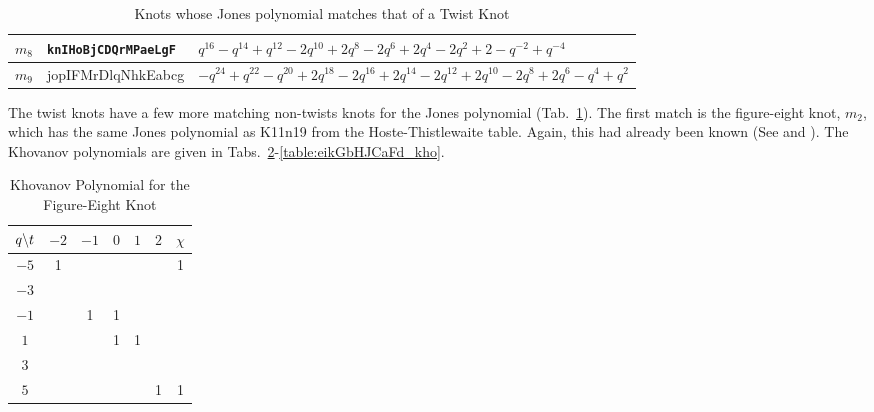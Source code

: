 \documentclass{article}
\theoremstyle{plain}
\begin{document}
\begin{table}[H]
{\begin{tabular}{| l | l | l |}
                    \hline
                        $m_{8}$&
                        \texttt{knIHoBjCDQrMPaeLgF}&
                        $q^{16}-q^{14}+q^{12}-2q^{10}+2q^{8}-2q^{6}+2q^{4}-2q^{2}+2-q^{-2}+q^{-4}$\\
                    \hline
                        $m_{9}$&
                        jopIFMrDlqNhkEabcg&
                        $-q^{24}+q^{22}-q^{20}+2q^{18}-2q^{16}+2q^{14}-2q^{12}+2q^{10}-2q^{8}+2q^{6}-q^{4}+q^{2}$\\
                    \hline
                \end{tabular}%
            }
            \caption{Knots whose Jones polynomial matches that of a Twist Knot}
            \label{table:matching_twist_knots}
        \end{table}
        The twist knots have a few more matching non-twists knots for the
        Jones polynomial
        (Tab.~\ref{table:matching_twist_knots}). The first match is the
        figure-eight knot, $m_{2}$, which has the same Jones polynomial as
        K11n19 from the Hoste-Thistlewaite table.
        Again, this had already been known
        (See \cite{KatlasFigureEight} and \cite{KatlasK11n19}).
        The Khovanov polynomials are
        given in Tabs.~\ref{table:m_2_kho}-\ref{table:eikGbHJCaFd_kho}.
        \begin{table}[H]
            \centering
            \begin{tabular}{| c | c | c | c | c | c | c |}
                \hline
                $q\symbol{92}t$&$-2$&$-1$&$0$&$1$&$2$&$\chi$\\
                \hline
                $-5$&1&&&&&1\\
                \hline
                $-3$&&&&&&\\
                \hline
                $-1$&&1&1&&&\\
                \hline
                $1$&&&1&1&&\\
                \hline
                $3$&&&&&&\\
                \hline
                $5$&&&&&1&1\\
                \hline
            \end{tabular}
            \caption{Khovanov Polynomial for the Figure-Eight Knot}
            \label{table:m_2_kho}
        \end{table}
\end{document}
